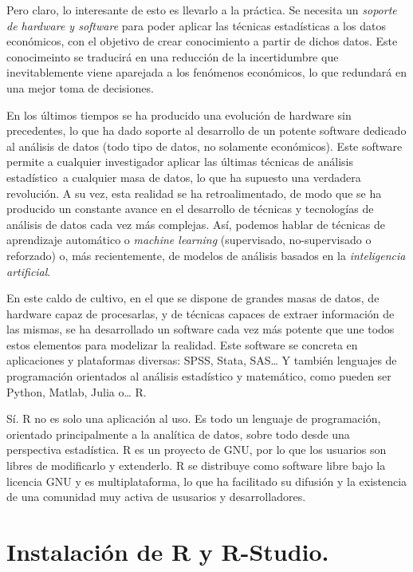 \documentclass[
]{book}
\begin{document}
Pero claro, lo interesante de esto es llevarlo a la práctica. Se necesita un \emph{soporte de hardware y software} para poder aplicar las técnicas estadísticas a los datos económicos, con el objetivo de crear conocimiento a partir de dichos datos. Este conocimeinto se traducirá en una reducción de la incertidumbre que inevitablemente viene aparejada a los fenómenos económicos, lo que redundará en una mejor toma de decisiones.

En los últimos tiempos se ha producido una evolución de hardware sin precedentes, lo que ha dado soporte al desarrollo de un potente software dedicado al análisis de datos (todo tipo de datos, no solamente económicos). Este software permite a cualquier investigador aplicar las últimas técnicas de análisis estadístico~a cualquier masa de datos, lo que ha supuesto una verdadera revolución. A su vez, esta realidad se ha retroalimentado, de modo que se ha producido un constante avance en el desarrollo de técnicas y tecnologías de análisis de datos cada vez más complejas. Así, podemos hablar de técnicas de aprendizaje automático o \emph{machine learning} (supervisado, no-supervisado o reforzado) o, más recientemente, de modelos de análisis basados en la \emph{inteligencia artificial}.

En este caldo de cultivo, en el que se dispone de grandes masas de datos, de hardware capaz de procesarlas, y de técnicas capaces de extraer información de las mismas, se ha desarrollado un software cada vez más potente que une todos estos elementos para modelizar la realidad. Este software se concreta en aplicaciones y plataformas diversas: SPSS, Stata, SAS\ldots{} Y también lenguajes de programación orientados al análisis estadístico y matemático, como pueden ser Python, Matlab, Julia o\ldots{} R.

Sí. R no es solo una aplicación al uso. Es todo un lenguaje de programación, orientado principalmente a la analítica de datos, sobre todo desde una perspectiva estadística. R es un proyecto de GNU, por lo que los usuarios son libres de modificarlo y extenderlo. R se distribuye como software libre bajo la licencia GNU y es multiplataforma, lo que ha facilitado su difusión y la existencia de una comunidad muy activa de ususarios y desarrolladores.

\section{Instalación de R y R-Studio.}\label{instalaciuxf3n-de-r-y-r-studio.}
\end{document}
